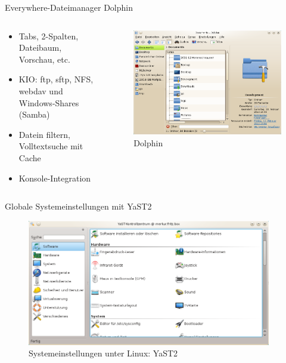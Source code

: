 \begin{frame}{Everywhere-Dateimanager Dolphin}
  \begin{columns}
    \begin{column}{0.45\textwidth}
      \begin{itemize}
        \item Tabs, 2-Spalten, Dateibaum, Vorschau, etc.
        \item KIO: ftp, sftp, NFS, webdav und Windows-Shares (Samba)
        \item Datein filtern, Volltextsuche mit Cache
        \item Konsole-Integration
      \end{itemize}      
    \end{column}
    \begin{column}{0.55\textwidth}
      \begin{figure}
        \includegraphics[keepaspectratio=true,width=\textwidth]{dolphin}
        \caption{Dolphin}
      \end{figure}
    \end{column}
  \end{columns}
\end{frame}

\begin{frame}{Globale Systemeinstellungen mit YaST2}
  \begin{figure}
    \includegraphics[keepaspectratio=true,width=0.95\textwidth]{yast2}
    \caption{Systemeinstellungen unter Linux: YaST2}
  \end{figure}
\end{frame}

